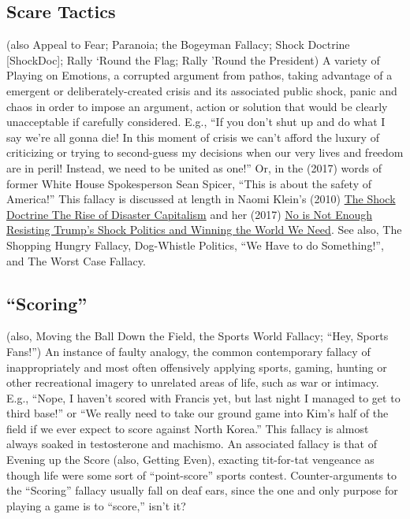 \documentclass[10pt,a4paper,british]{article}
\begin{document}
\begin{multicols}{2}
    \subsection{Scare Tactics} (also Appeal to Fear; Paranoia; the Bogeyman Fallacy; Shock Doctrine [ShockDoc]; Rally `Round the Flag; Rally 'Round the President) A variety of Playing on Emotions, a corrupted argument from pathos, taking advantage of a emergent or deliberately{-}created crisis and its associated public shock, panic and chaos in order to impose an argument, action or solution that would be clearly unacceptable if carefully considered. E.g., ``If you don't shut up and do what I say we're all gonna die! In this moment of crisis we can't afford the luxury of criticizing or trying to second{-}guess my decisions when our very lives and freedom are in peril!  Instead, we need to be united as one!'' Or, in the (2017) words of former White House Spokesperson Sean Spicer, ``This is about the safety of America!'' This fallacy is discussed at length in Naomi Klein's (2010) \href{https://www.amazon.com/Shock-Doctrine-Rise-Disaster-Capitalism/dp/080507983}{The Shock Doctrine The Rise of Disaster Capitalism} and her (2017) \href{https://www.amazon.com/No-Not-Enough-Resisting-Politics/dp/1608468909}{No is Not Enough Resisting Trump's Shock Politics and Winning the World We Need}. See also, The Shopping Hungry Fallacy, Dog{-}Whistle Politics, ``We Have to do Something!'', and The Worst Case Fallacy.  

    \subsection{``Scoring''} (also, Moving the Ball Down the Field, the Sports World Fallacy; ``Hey, Sports Fans!'') An instance of faulty analogy, the common contemporary fallacy of inappropriately and most often offensively applying sports, gaming, hunting or other recreational imagery to unrelated areas of life, such as war or intimacy. E.g., ``Nope, I haven't scored with Francis yet, but last night I managed to get to third base!''  or ``We really need to take our ground game into Kim's half of the field if we ever expect to score against North Korea.'' This fallacy is almost always soaked in testosterone and machismo. An associated fallacy is that of Evening up the Score (also, Getting Even), exacting tit{-}for{-}tat vengeance as though life were some sort of ``point{-}score'' sports contest.  Counter{-}arguments to the ``Scoring'' fallacy usually fall on deaf ears, since the one and only purpose for playing a game is to ``score,'' isn't it?  


\end{multicols}
\end{document}
